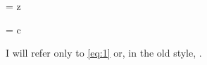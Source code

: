 \begin{EQ}\label{eq:1}
     = z
\end{EQ}
\begin{EQ}\label{eq:2}
     = c
\end{EQ}
I will refer only to \eqref{eq:1} or,
in the old style, .

